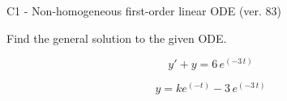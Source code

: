 \begin{exercise}
  \begin{exerciseTitle}C1 - Non-homogeneous first-order linear ODE (ver. 83)\end{exerciseTitle}
  \begin{exerciseStatement}
    
Find the general solution to the given ODE.

    
\[y'+y= 6 \, e^{\left(-3 \, t\right)}\]

  \end{exerciseStatement}
  \begin{exerciseAnswer}
    
\[y= k e^{\left(-t\right)} - 3 \, e^{\left(-3 \, t\right)}\]

  \end{exerciseAnswer}
\end{exercise}